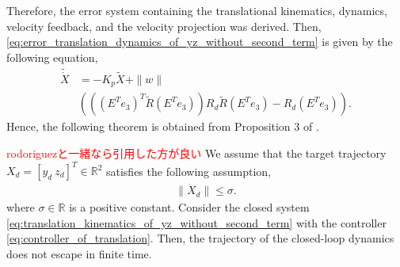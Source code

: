 Therefore, the error system containing the translational kinematics, dynamics, velocity feedback, and the velocity projection was derived.
Then, \eqref{eq:error_translation_dynamics_of_yz_without_second_term} is given by the following equation,
\begin{align}
    \tilde{\dot{X}} &= - K_p \tilde{X} + \|w\| \\
    &\left (  \left ( \left ( E^T e_3 \right )^T \tilde{R} \left (E^T e_3 \right ) \right ) R_d \tilde{R} \left (E^T e_3 \right ) - R_d \left (E^T e_3\right ) \right ).
    \label{eq:error_translation_of_yz_without_second_term_with_controller}
\end{align}
Hence, the following theorem is obtained from Proposition 3 of \cite{rodriguez-cortesNewGeometricTrajectory2022}.
\begin{theorem}{\textcolor{red}{rodoriguezと一緒なら引用した方が良い\cite{rodriguez-cortesNewGeometricTrajectory2022}}}
    We assume that the target trajectory $ X_d = [y_d ~ z_d]^T \in \mathbb{R}^2 $ satisfies the following assumption,
    \begin{align}
        \label{eq:assumption_of_Xd}
        \| \dot{X}_d \| \leq \sigma.
    \end{align}
    where $ \sigma \in \mathbb{R}$ is a positive constant.
    Consider the closed system \eqref{eq:translation_kinematics_of_yz_without_second_term} with the controller \eqref{eq:controller_of_translation}.
    Then, the trajectory of the closed-loop dynamics does not escape in finite time.
\end{theorem}
